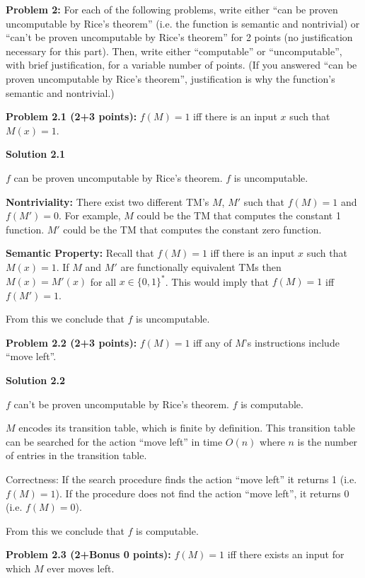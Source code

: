 \documentclass[11pt]{article}
\begin{document}
\textbf{Problem 2:} For each of the following problems, write either ``can be proven uncomputable by Rice's theorem'' (i.e. the function is semantic and nontrivial) or ``can't be proven uncomputable by Rice's theorem'' for 2 points (no justification necessary for this part). Then, write either ``computable'' or ``uncomputable'', with brief justification, for a variable number of points. (If you answered ``can be proven uncomputable by Rice's theorem'', justification is why the function's semantic and nontrivial.)

\textbf{Problem 2.1 (2+3 points):}  $f(M)=1$ iff there is an input $x$ such that $M(x) = 1$.

\textbf{Solution 2.1}

$f$ can be proven uncomputable by Rice's theorem. $f$ is uncomputable.

\textbf{Nontriviality:} There exist two different TM's $M$, $M'$ such that $f(M) = 1$ and $f(M') = 0$. For example, $M$ could be the TM that computes the constant 1 function. $M'$ could be the TM that computes the constant zero function. 

\textbf{Semantic Property:} Recall that $f(M) = 1$ iff there is an input $x$ such that $M(x) = 1$. If $M$ and $M'$ are functionally equivalent TMs then $M(x) = M'(x)$ for all $x \in \{0, 1\}^*$. This would imply that $f(M) = 1$ iff $f(M') = 1$.

From this we conclude that $f$ is uncomputable.

\newpage

\textbf{Problem 2.2 (2+3 points):} $f(M) = 1$ iff any of $M$'s instructions include ``move left''.

\textbf{Solution 2.2}

$f$ can't be proven uncomputable by Rice's theorem. $f$ is computable.

$M$ encodes its transition table, which is finite by definition. This transition table can be searched for the action ``move left'' in time $O(n)$ where $n$ is the number of entries in the transition table.

Correctness: If the search procedure finds the action ``move left'' it returns 1 (i.e. $f(M) = 1$). If the procedure does not find the action ``move left'', it returns 0 (i.e. $f(M) = 0$).

From this we conclude that $f$ is computable.

\newpage

\textbf{Problem 2.3 (2+Bonus 0 points):} $f(M) = 1$ iff there exists an input for which $M$ ever moves left.
\end{document}
